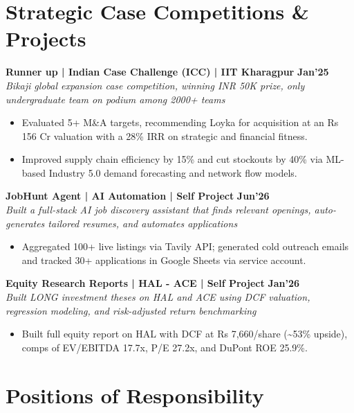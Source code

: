 \documentclass[10pt, a4paper]{article}
\newenvironment{achievelist}{
  \begin{itemize}[leftmargin=1.2em, itemsep=0.5pt, parsep=0pt, topsep=1pt]
    \small
}{
  \end{itemize}
  \vspace{-2pt}
}
\newcommand{\achieve}[1]{\item #1}
\begin{document}
\vspace{-2pt}

\section{Strategic Case Competitions \& Projects}

\textbf{Runner up | Indian Case Challenge (ICC) | IIT Kharagpur} \hfill \textbf{\small Jan'25} \\
\textit{\small Bikaji global expansion case competition, winning INR 50K prize, only undergraduate team on podium among 2000+ teams}
\begin{achievelist}
  \achieve{Evaluated 5+ M\&A targets, recommending Loyka for acquisition at an Rs 156 Cr valuation with a 28\% IRR on strategic and financial fitness.}
  \achieve{Improved supply chain efficiency by 15\% and cut stockouts by 40\% via ML-based Industry 5.0 demand forecasting and network flow models.}
\end{achievelist}

\textbf{JobHunt Agent | AI Automation | Self Project} \hfill \textbf{\small Jun'26} \\
\textit{\small Built a full-stack AI job discovery assistant that finds relevant openings, auto-generates tailored resumes, and automates applications}
\begin{achievelist}
  \achieve{Aggregated 100+ live listings via Tavily API; generated cold outreach emails and tracked 30+ applications in Google Sheets via service account.}
\end{achievelist}

\textbf{Equity Research Reports | HAL - ACE | Self Project} \hfill \textbf{\small Jan'26} \\
\textit{\small Built LONG investment theses on HAL and ACE using DCF valuation, regression modeling, and risk-adjusted return benchmarking}
\begin{achievelist}
  \achieve{Built full equity report on HAL with DCF at Rs 7,660/share (\textasciitilde 53\% upside), comps of EV/EBITDA 17.7x, P/E 27.2x, and DuPont ROE 25.9\%.}
\end{achievelist}

\vspace{-2pt}

\section{Positions of Responsibility}
\end{document}
